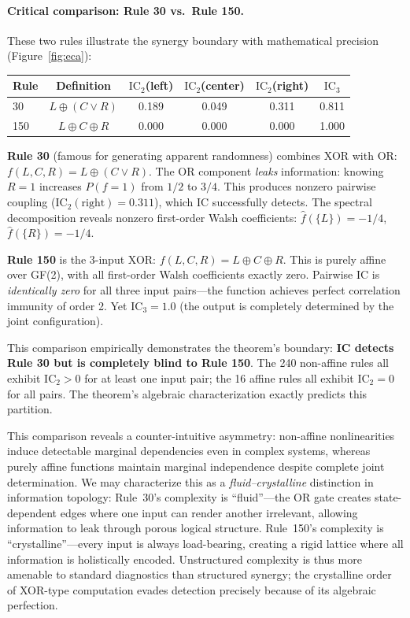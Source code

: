 \documentclass[10pt]{article} %
\theoremstyle{plain}
\theoremstyle{definition}
\newcommand{\IC}{\mathrm{IC}}  %
\begin{document}
\paragraph{Critical comparison: Rule 30 vs.\ Rule 150.} These two rules illustrate the synergy boundary with mathematical precision (Figure~\ref{fig:eca}):

\begin{center}
\begin{tabular}{lccccc}
\toprule
\textbf{Rule} & \textbf{Definition} & \textbf{$\IC_2$(left)} & \textbf{$\IC_2$(center)} & \textbf{$\IC_2$(right)} & \textbf{$\IC_3$} \\
\midrule
30 & $L \oplus (C \lor R)$ & 0.189 & 0.049 & 0.311 & 0.811 \\
150 & $L \oplus C \oplus R$ & 0.000 & 0.000 & 0.000 & 1.000 \\
\bottomrule
\end{tabular}
\end{center}

\noindent \textbf{Rule 30} (famous for generating apparent randomness) combines XOR with OR: $f(L, C, R) = L \oplus (C \lor R)$. The OR component \emph{leaks} information: knowing $R = 1$ increases $P(f = 1)$ from $1/2$ to $3/4$. This produces nonzero pairwise coupling ($\text{IC}_2(\text{right}) = 0.311$), which IC successfully detects. The spectral decomposition reveals nonzero first-order Walsh coefficients: $\hat{f}(\{L\}) = -1/4$, $\hat{f}(\{R\}) = -1/4$.

\noindent \textbf{Rule 150} is the 3-input XOR: $f(L, C, R) = L \oplus C \oplus R$. This is purely affine over GF(2), with all first-order Walsh coefficients exactly zero. Pairwise IC is \emph{identically zero} for all three input pairs---the function achieves perfect correlation immunity of order 2. Yet $\text{IC}_3 = 1.0$ (the output is completely determined by the joint configuration).

This comparison empirically demonstrates the theorem's boundary: \textbf{IC detects Rule 30 but is completely blind to Rule 150}. The 240 non-affine rules all exhibit $\IC_2 > 0$ for at least one input pair; the 16 affine rules all exhibit $\IC_2 = 0$ for all pairs. The theorem's algebraic characterization exactly predicts this partition.

This comparison reveals a counter-intuitive asymmetry: non-affine nonlinearities induce detectable marginal dependencies even in complex systems, whereas purely affine functions maintain marginal independence despite complete joint determination. We may characterize this as a \emph{fluid--crystalline} distinction in information topology: Rule~30's complexity is ``fluid''---the OR gate creates state-dependent edges where one input can render another irrelevant, allowing information to leak through porous logical structure. Rule~150's complexity is ``crystalline''---every input is always load-bearing, creating a rigid lattice where all information is holistically encoded. Unstructured complexity is thus more amenable to standard diagnostics than structured synergy; the crystalline order of XOR-type computation evades detection precisely because of its algebraic perfection.
\end{document}
